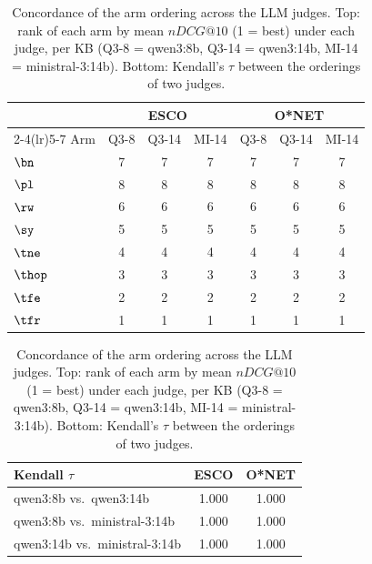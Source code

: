 \begin{table}
\centering\scriptsize
\caption{Concordance of the arm ordering across the LLM judges. Top: rank of each arm by mean $nDCG@10$ (1 = best) under each judge, per KB (Q3-8 = qwen3:8b, Q3-14 = qwen3:14b, MI-14 = ministral-3:14b). Bottom: Kendall's $\tau$ between the orderings of two judges.}
\label{tab:arm-conc-judges}
\begin{tabular*}{\columnwidth}{@{\extracolsep{\fill}}lcccccc}
\toprule
& \multicolumn{3}{c}{ESCO} & \multicolumn{3}{c}{O*NET} \\
\cmidrule(lr){2-4}\cmidrule(lr){5-7}
Arm & Q3-8 & Q3-14 & MI-14 & Q3-8 & Q3-14 & MI-14 \\
\midrule
$\bn$ & 7 & 7 & 7 & 7 & 7 & 7 \\
$\pl$ & 8 & 8 & 8 & 8 & 8 & 8 \\
$\rw$ & 6 & 6 & 6 & 6 & 6 & 6 \\
$\sy$ & 5 & 5 & 5 & 5 & 5 & 5 \\
$\tne$ & 4 & 4 & 4 & 4 & 4 & 4 \\
$\thop$ & 3 & 3 & 3 & 3 & 3 & 3 \\
$\tfe$ & 2 & 2 & 2 & 2 & 2 & 2 \\
$\tfr$ & 1 & 1 & 1 & 1 & 1 & 1 \\
\bottomrule
\end{tabular*}
\par\medskip
\begin{tabular*}{\columnwidth}{@{\extracolsep{\fill}}lcc}
\toprule
Kendall $\tau$ & ESCO & O*NET \\
\midrule
qwen3:8b vs.\ qwen3:14b & 1.000 & 1.000 \\
qwen3:8b vs.\ ministral-3:14b & 1.000 & 1.000 \\
qwen3:14b vs.\ ministral-3:14b & 1.000 & 1.000 \\
\bottomrule
\end{tabular*}
\end{table}
